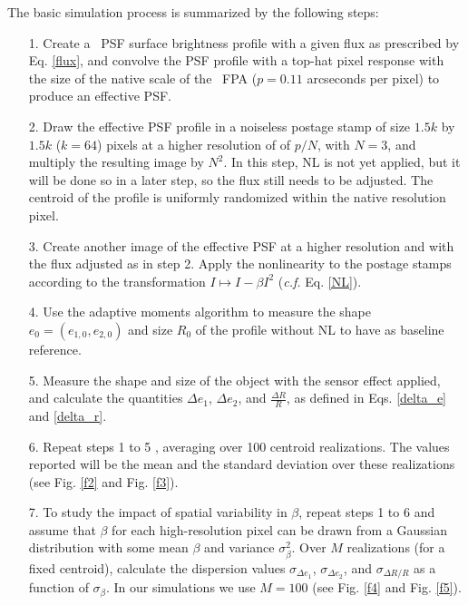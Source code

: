 \documentclass[11pt,preprint,flushrt]{aastex}
\begin{document}
The basic simulation process is summarized by the following steps:  
\begin{itemize}
\item[1.] Create a \wfa\ PSF surface brightness profile with a given flux as prescribed by Eq. \ref{flux}, and convolve the PSF profile with a top-hat pixel response with the size of the native scale of the \wfa\ FPA ($p=0.11$ arcseconds per pixel) to produce an effective PSF. 
\item[2.] Draw the effective PSF profile in a noiseless postage stamp of size $1.5k$ by $1.5k$ ($k=64$) pixels at a higher resolution of of $p/N$, with $N=3$, and multiply the resulting image by $N^2$. In this step, NL is not yet applied, but it will be done so in a later step, so the flux still needs to be adjusted. The centroid of the profile is uniformly randomized within the native resolution pixel.
\item[3.] Create another image of the effective PSF at a higher resolution and with the flux adjusted as in step 2. 
Apply the nonlinearity to the postage stamps according to the transformation $I \mapsto I - \beta I^2$ (\emph{c.f.} Eq. \ref{NL}).
\item[4.] Use the adaptive moments algorithm to measure the shape $e_0=(e_{1,0}, e_{2,0})$ and size $R_0$ of the profile without NL to have as baseline reference.
\item[5.] Measure the shape and size of the object with the sensor effect applied, and calculate the quantities $\Delta e_1$, $\Delta e_2$, and $\frac{\Delta R}{R}$, as defined in Eqs. \ref{delta_e} and \ref{delta_r}. 
\item [6.] Repeat steps 1 to 5 %
, averaging over 100 centroid realizations. The values reported will be the mean and the standard deviation over these realizations (see Fig. \ref{f2} and Fig. \ref{f3}).
\item[7.] To study the impact of spatial variability in $\beta$, repeat steps 1 to 6 and assume that $\beta$ for each high-resolution pixel can be drawn from a Gaussian distribution with some mean $\beta$ and variance $\sigma_{\beta}^2$. Over $M$ realizations (for a fixed centroid), calculate the dispersion values $\sigma_{\Delta e_1}$, $\sigma_{\Delta e_2}$, and $\sigma_{\Delta R/R}$ as a function of $\sigma_{\beta}$. In our simulations we use $M=100$ (see Fig. \ref{f4} and Fig. \ref{f5}). 

\end{itemize}
\end{document}
